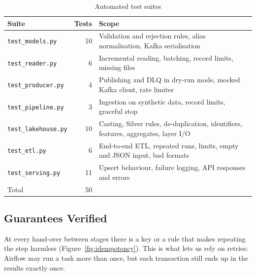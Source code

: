 \documentclass[11pt,a4paper]{article}
\newcommand{\code}[1]{\texttt{#1}}
\begin{document}
\begin{table}[H]
\centering
\caption{Automated test suites}
\label{tab:tests}
\begin{tabularx}{\linewidth}{lrL}
\toprule
Suite & Tests & Scope \\
\midrule
\code{test\_models.py} & 10 & Validation and rejection rules, alias normalisation, Kafka serialisation \\
\code{test\_reader.py} & 6 & Incremental reading, batching, record limits, missing files \\
\code{test\_producer.py} & 4 & Publishing and DLQ in dry-run mode, mocked Kafka client, rate limiter \\
\code{test\_pipeline.py} & 3 & Ingestion on synthetic data, record limits, graceful stop \\
\code{test\_lakehouse.py} & 10 & Casting, Silver rules, de-duplication, identifiers, features, aggregates, layer I/O \\
\code{test\_etl.py} & 6 & End-to-end ETL, repeated runs, limits, empty and JSON input, bad formats \\
\code{test\_serving.py} & 11 & Upsert behaviour, failure logging, API responses and errors \\
\midrule
Total & 50 & \\
\bottomrule
\end{tabularx}
\end{table}

\subsection{Guarantees Verified}
At every hand-over between stages there is a key or a rule that makes repeating
the step harmless (Figure~\ref{fig:idempotency}). This is what lets us rely on
retries: Airflow may run a task more than once, but each transaction still ends
up in the results exactly once.
\end{document}
